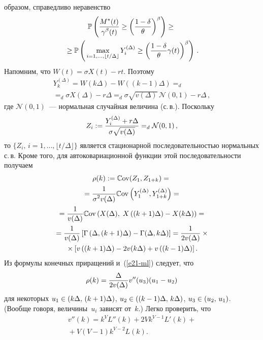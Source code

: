 \begin{multicols}{2}
образом, справедливо неравенство
\begin{multline}
\mathbb{P} \left( \fr{M^*(t)}{\gamma^\beta(t)} \geq\left(
\fr{1-\delta}{\theta}\right)^\beta \right) \geq{}\\
{}\geq \mathbb{P} \left(
\vphantom{\left(\fr{1-\delta}{theta}\right)^\beta}
\max\limits_{i=1,\ldots ,\lfloor t/\Delta \rfloor}Y_i^{(\Delta)} \geq
\left(\fr{1-\delta}{\theta}\gamma (t)\right)^\beta\right)\,.
\label{asymp1-l4}
\end{multline}
Напомним, что  $W(t)=\sigma X(t)-rt$. Поэтому
\begin{multline*}
Y_k^{(\Delta)}= W(k\Delta)-W((k-1)\Delta)=_d{}\\
{}=_d \sigma X(\Delta)-r\Delta =_d \sigma \sqrt{v(\Delta)}\,\mathcal{N} (0,1)-r\Delta\,,
\end{multline*}
где $\mathcal{N} (0,1)$~--- нормальная случайная величина (с.\,в.). Поскольку
\begin{equation}
Z_i :=\displaystyle\frac{\displaystyle Y_i^{(\Delta)}+r\Delta \mathstrut}{\displaystyle \sigma \sqrt{v(\Delta)}\mathstrut}=_d
\mathcal{N}(0,1)\,,\label{e19-ml}
\end{equation} 
то $\{Z_i,\,i=1,\ldots,\lfloor t/\Delta \rfloor\}$  
является  стационарной последовательностью нормальных
с.\,в. Кроме того, для автоковариационной функции этой
последовательности получаем
\begin{multline}
\rho(k):=\mathbb{C}\mathrm{ov}(Z_1,Z_{1+k})
={}\\
{}=\displaystyle\frac{\displaystyle 1\mathstrut}{\displaystyle \sigma^2 v(\Delta)\mathstrut}\mathbb{C}\mathrm{ov} \left( Y_1^{(\Delta)},Y_{1+k}^{(\Delta)} \right)={}\\
{}=\displaystyle\frac{\displaystyle 1\mathstrut}{\displaystyle v(\Delta)\mathstrut}\mathbb{C}\mathrm{ov} \left(X(\Delta),\;X\left((k+1)\Delta\right)-X(k\Delta) \right)={}\\
{}=\displaystyle\frac{\displaystyle 1\mathstrut}{\displaystyle v(\Delta)\mathstrut}\left[
\Gamma\left(\Delta,(k+1)\Delta\right)-\Gamma(\Delta,k\Delta) \right]=
\displaystyle\frac{\displaystyle 1\mathstrut}{\displaystyle 2v(\Delta)\mathstrut}\times{}\\
{}\times\left[ v\left( (k+1)\Delta
\right)-2v(k\Delta)+v\left( (k-1)\Delta\right) \right].\label{e21-ml}
\end{multline}
Из  формулы конечных приращений и~(\ref{e21-ml}) следует, что
$$
\rho(k)=\displaystyle\frac{\displaystyle \Delta\mathstrut}{\displaystyle 2v(\Delta)\mathstrut}v''(u_3)(u_1-u_2)
$$
для некоторых $u_1\hm\in (k \Delta,\,(k+1)\Delta)$, $u_2\hm \in((k\hm-1)\Delta,\,k\Delta)$, 
$u_3\hm\in (u_2,\,u_1)$. (Вообще говоря,
величины~$u_i$  зависят от~$k$.) Легко проверить, что
\begin{multline}
v''(k)=k^VL''(k)+2Vk^{V-1}L'(k)+{}\\
{}+V(V-1)k^{V-2}L(k). 
\label{21'}
\end{multline}

\end{multicols}
